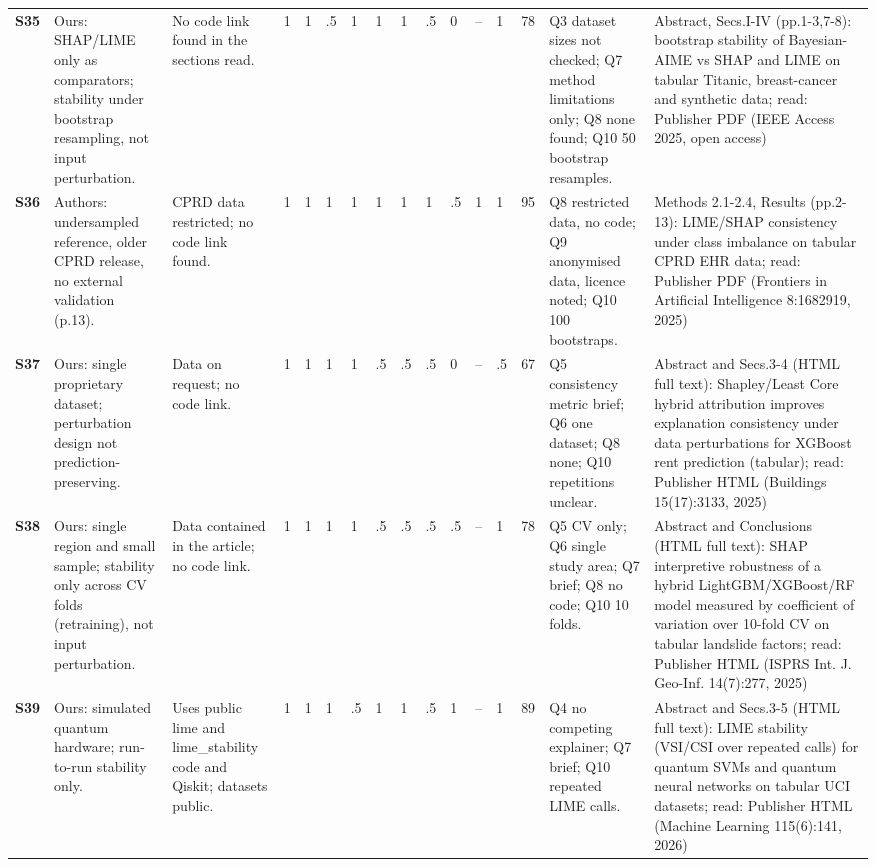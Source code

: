 \begin{longtable}{@{}P{1.0cm}P{4.6cm}P{3.6cm}P{0.3cm}P{0.3cm}P{0.3cm}P{0.3cm}P{0.3cm}P{0.3cm}P{0.3cm}P{0.3cm}P{0.3cm}P{0.36cm}P{0.75cm}P{3.0cm}P{3.9cm}@{}}
\textbf{S35} & Ours: SHAP/\allowbreak{}LIME only as comparators; stability under bootstrap resampling, not input perturbation. & No code link found in the sections read. & 1 & 1 & .5 & 1 & 1 & 1 & .5 & 0 & -- & 1 & 78 & Q3 dataset sizes not checked; Q7 method limitations only; Q8 none found; Q10 50 bootstrap resamples. & Abstract, Secs.I-IV (pp.1-3,7-8): bootstrap stability of Bayesian-AIME vs SHAP and LIME on tabular Titanic, breast-cancer and synthetic data; read: Publisher PDF (IEEE Access 2025, open access) \\
\textbf{S36} & Authors: undersampled reference, older CPRD release, no external validation (p.13). & CPRD data restricted; no code link found. & 1 & 1 & 1 & 1 & 1 & 1 & 1 & .5 & 1 & 1 & 95 & Q8 restricted data, no code; Q9 anonymised data, licence noted; Q10 100 bootstraps. & Methods 2.1-2.4, Results (pp.2-13): LIME/\allowbreak{}SHAP consistency under class imbalance on tabular CPRD EHR data; read: Publisher PDF (Frontiers in Artificial Intelligence 8:1682919, 2025) \\
\textbf{S37} & Ours: single proprietary dataset; perturbation design not prediction-preserving. & Data on request; no code link. & 1 & 1 & 1 & 1 & .5 & .5 & .5 & 0 & -- & .5 & 67 & Q5 consistency metric brief; Q6 one dataset; Q8 none; Q10 repetitions unclear. & Abstract and Secs.3-4 (HTML full text): Shapley/\allowbreak{}Least Core hybrid attribution improves explanation consistency under data perturbations for XGBoost rent prediction (tabular); read: Publisher HTML (Buildings 15(17):3133, 2025) \\
\textbf{S38} & Ours: single region and small sample; stability only across CV folds (retraining), not input perturbation. & Data contained in the article; no code link. & 1 & 1 & 1 & 1 & .5 & .5 & .5 & .5 & -- & 1 & 78 & Q5 CV only; Q6 single study area; Q7 brief; Q8 no code; Q10 10 folds. & Abstract and Conclusions (HTML full text): SHAP interpretive robustness of a hybrid LightGBM/\allowbreak{}XGBoost/\allowbreak{}RF model measured by coefficient of variation over 10-fold CV on tabular landslide factors; read: Publisher HTML (ISPRS Int. J. Geo-Inf. 14(7):277, 2025) \\
\textbf{S39} & Ours: simulated quantum hardware; run-to-run stability only. & Uses public lime and lime\_\allowbreak{}stability code and Qiskit; datasets public. & 1 & 1 & 1 & .5 & 1 & 1 & .5 & 1 & -- & 1 & 89 & Q4 no competing explainer; Q7 brief; Q10 repeated LIME calls. & Abstract and Secs.3-5 (HTML full text): LIME stability (VSI/\allowbreak{}CSI over repeated calls) for quantum SVMs and quantum neural networks on tabular UCI datasets; read: Publisher HTML (Machine Learning 115(6):141, 2026) \\

\end{longtable}
